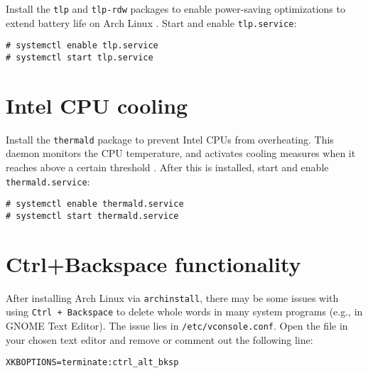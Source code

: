 \documentclass[a4paper]{article}
\begin{document}
Install the \lstinline|tlp| and \lstinline|tlp-rdw| packages to enable power-saving optimizations to extend battery life on Arch Linux \cite{tlp-installation}.
Start and enable \lstinline|tlp.service|:
\begin{lstlisting}
# systemctl enable tlp.service
# systemctl start tlp.service
\end{lstlisting}

\section{Intel CPU cooling}

Install the \lstinline|thermald| package to prevent Intel CPUs from overheating.
This daemon monitors the CPU temperature, and activates cooling measures when it reaches above a certain threshold \cite{arch-wiki-thermald}.
After this is installed, start and enable \lstinline|thermald.service|:
\begin{lstlisting}
# systemctl enable thermald.service
# systemctl start thermald.service
\end{lstlisting}

\section{Ctrl+Backspace functionality}

After installing Arch Linux via \lstinline|archinstall|, there may be some issues with using \lstinline|Ctrl + Backspace| to delete whole words in many system programs (e.g., in GNOME Text Editor).
The issue lies in \lstinline|/etc/vconsole.conf|.
Open the file in your chosen text editor and remove or comment out the following line:
\begin{lstlisting}
XKBOPTIONS=terminate:ctrl_alt_bksp
\end{lstlisting}
\end{document}
